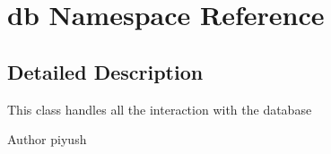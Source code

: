 \hypertarget{namespacedb}{\section{db Namespace Reference}
\label{namespacedb}
}


\subsection{Detailed Description}
This class handles all the interaction with the database

\begin{DoxyAuthor}{Author}
piyush 
\end{DoxyAuthor}
